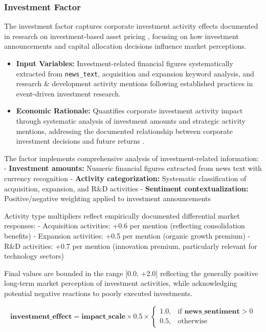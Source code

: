 \documentclass[3p,times,procedia]{elsarticle}
\begin{document}
\subsubsection{{Investment Factor}}

The investment factor captures corporate investment activity effects documented in research on investment-based asset pricing \cite{Daniel1998}, focusing on how investment announcements and capital allocation decisions influence market perceptions.

\begin{itemize}
    \item \textbf{Input Variables:} Investment-related financial figures systematically extracted from \texttt{news\_text}, acquisition and expansion keyword analysis, and research \& development activity mentions following established practices in event-driven investment research.
    \item \textbf{Economic Rationale:} Quantifies corporate investment activity impact through systematic analysis of investment amounts and strategic activity mentions, addressing the documented relationship between corporate investment decisions and future returns \cite{Daniel1998}.
\end{itemize}

The factor implements comprehensive analysis of investment-related information:
- \textbf{Investment amounts:} Numeric financial figures extracted from news text with currency recognition
- \textbf{Activity categorization:} Systematic classification of acquisition, expansion, and R\&D activities
- \textbf{Sentiment contextualization:} Positive/negative weighting applied to investment announcements

Activity type multipliers reflect empirically documented differential market responses:
- Acquisition activities: +0.6 per mention (reflecting consolidation benefits)
- Expansion activities: +0.5 per mention (organic growth premium)
- R\&D activities: +0.7 per mention (innovation premium, particularly relevant for technology sectors)

Final values are bounded in the range [0.0, +2.0] reflecting the generally positive long-term market perception of investment activities, while acknowledging potential negative reactions to poorly executed investments.

\begin{equation}
\textbf{investment\_effect} = \textbf{impact\_scale} \times 0.5 \times 
\begin{cases} 
1.0, & \text{if } \textbf{news\_sentiment} > 0 \\
0.5, & \text{otherwise}
\end{cases}
\end{equation}
\end{document}
